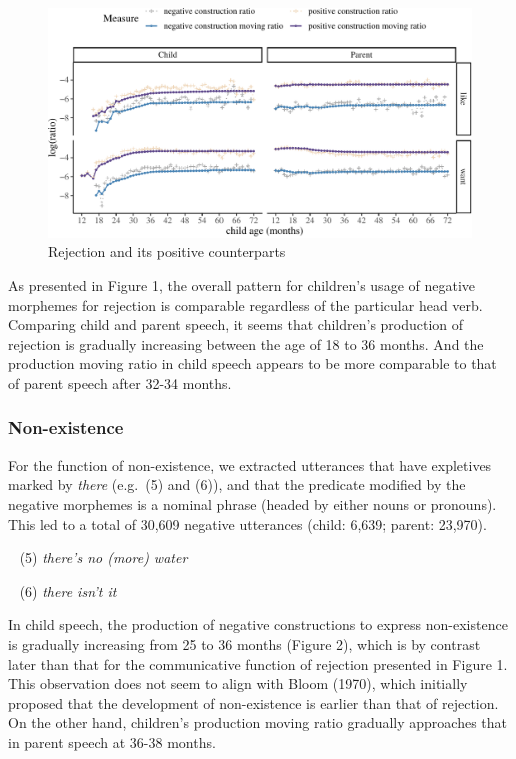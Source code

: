 \documentclass[
  english,
  man,floatsintext]{apa6}
\begin{document}
\begin{figure}[H]

{\centering \includegraphics{neg_construction_article_files/figure-latex/emotion-1} 

}

\caption{Rejection and its positive counterparts}\label{fig:emotion}
\end{figure}

As presented in Figure 1, the overall pattern for children's usage of negative morphemes for rejection is comparable regardless of the particular head verb. Comparing child and parent speech, it seems that children's production of rejection is gradually increasing between the age of 18 to 36 months. And the production moving ratio in child speech appears to be more comparable to that of parent speech after 32-34 months.

\clearpage

\hypertarget{non-existence}{%
\subsubsection{Non-existence}\label{non-existence}}

For the function of non-existence, we extracted utterances that have expletives marked by \emph{there} (e.g.~(5) and (6)), and that the predicate modified by the negative morphemes is a nominal phrase (headed by either nouns or pronouns). This led to a total of 30,609 negative utterances (child: 6,639; parent: 23,970).

~
(5) \emph{there's no (more) water}

~
(6) \emph{there isn't it}

In child speech, the production of negative constructions to express non-existence is gradually increasing from 25 to 36 months (Figure 2), which is by contrast later than that for the communicative function of rejection presented in Figure 1. This observation does not seem to align with Bloom (1970), which initially proposed that the development of non-existence is earlier than that of rejection. On the other hand, children's production moving ratio gradually approaches that in parent speech at 36-38 months.
\end{document}
